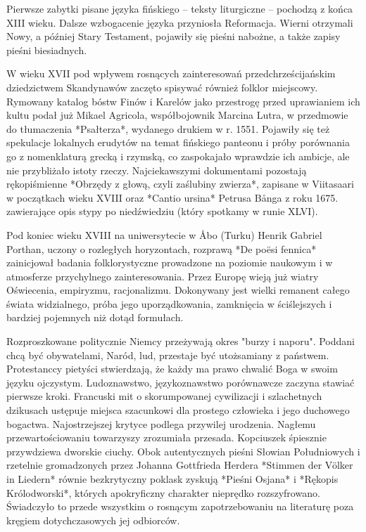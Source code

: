 Pierwsze zabytki pisane języka fińskiego -- teksty liturgiczne -- pochodzą z końca XIII wieku. Dalsze wzbogacenie języka przyniosła Reformacja. Wierni otrzymali Nowy, a później Stary Testament, pojawiły się pieśni nabożne, a także zapisy pieśni biesiadnych.

W wieku XVII pod wpływem rosnących zainteresowań przedchrześcijańskim dziedzictwem Skandynawów zaczęto spisywać również folklor miejscowy. Rymowany katalog bóstw Finów i Karelów jako przestrogę przed uprawianiem ich kultu podał już Mikael Agricola, współbojownik Marcina Lutra, w przedmowie do tłumaczenia *Psałterza*, wydanego drukiem w r. 1551. Pojawiły się też spekulacje lokalnych erudytów na temat fińskiego panteonu i próby porównania go z nomenklaturą grecką i rzymską, co zaspokajało wprawdzie ich ambicje, ale nie przybliżało istoty rzeczy. Najciekawszymi dokumentami pozostają rękopiśmienne *Obrzędy z głową, czyli zaślubiny zwierza*, zapisane w Viitasaari w początkach wieku XVIII oraz *Cantio ursina* Petrusa Bånga z roku 1675. zawierające opis stypy po niedźwiedziu (który spotkamy w runie XLVI).

Pod koniec wieku XVIII na uniwersytecie w Åbo (Turku) Henrik Gabriel Porthan, uczony o rozległych horyzontach, rozprawą *De poësi fennica* zainicjował badania folklorystyczne prowadzone na poziomie naukowym i w atmosferze przychylnego zainteresowania. Przez Europę wieją już wiatry Oświecenia, empiryzmu, racjonalizmu. Dokonywany jest wielki remanent całego świata widzialnego, próba jego uporządkowania, zamknięcia w ściślejszych i bardziej pojemnych niż dotąd formułach.

Rozproszkowane politycznie Niemcy przeżywają okres "burzy i naporu". Poddani chcą być obywatelami, Naród, lud, przestaje być utożsamiany z państwem. Protestanccy pietyści stwierdzają, że każdy ma prawo chwalić Boga w swoim języku ojczystym. Ludoznawstwo, językoznawstwo porównawcze zaczyna stawiać pierwsze kroki. Francuski mit o skorumpowanej cywilizacji i szlachetnych dzikusach ustępuje miejsca szacunkowi dla prostego człowieka i jego duchowego bogactwa. Najostrzejszej krytyce podlega przywilej urodzenia. Nagłemu przewartościowaniu towarzyszy zrozumiała przesada. Kopciuszek śpiesznie przywdziewa dworskie ciuchy. Obok autentycznych pieśni Słowian Południowych i rzetelnie gromadzonych przez Johanna Gottfrieda Herdera *Stimmen der Völker in Liedern* równie bezkrytyczny poklask zyskują *Pieśni Osjana* i *Rękopis Królodworski*, których apokryficzny charakter nieprędko rozszyfrowano. Świadczyło to przede wszystkim o rosnącym zapotrzebowaniu na literaturę poza kręgiem dotychczasowych jej odbiorców.

